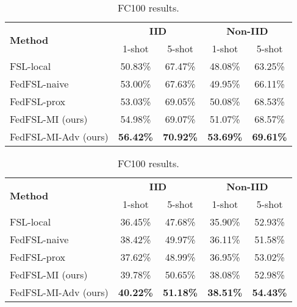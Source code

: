 \begin{table}[htb]
\caption{Results on benchmark datasets.}
\small
\begin{subtable}{\linewidth}
{
\begin{center}
\begin{tabular}{lcccc} \toprule  
\multirow{2}{*}{\textbf{Method}} & \multicolumn{2}{c}{\textbf{IID}} & \multicolumn{2}{c}{\textbf{Non-IID}} \\ 
\cmidrule{2-3} \cmidrule{4-5}    & 1-shot   & 5-shot  & 1-shot   & 5-shot \\ \toprule
FSL-local  & 50.83\%	&  67.47\% & 48.08\% & 63.25\%	 \\
FedFSL-naive~\cite{chen2018fedmeta} & 53.00\%	 &  67.63\%	& 49.95\% & 66.11\% \\
FedFSL-prox~\cite{li2018federated} &  53.03\%	 &  69.05\%	& 50.08\% & 68.53\% \\ \midrule
FedFSL-MI (ours)  & 54.98\% & 69.07\% & 51.07\% & 68.57\% \\
FedFSL-MI-Adv (ours)  & \textbf{56.42\%}	&	\textbf{70.92\%}  & \textbf{53.69\%}& \textbf{69.61\%}    \\  \midrule \bottomrule
\end{tabular}
\end{center}
}
\vspace{-2pt}
\caption{MiniImageNet results.}
\end{subtable}

\begin{subtable}{\linewidth}
{\begin{center}
\begin{tabular}{lcccc} \toprule  
\multirow{2}{*}{\textbf{Method}} & \multicolumn{2}{c}{\textbf{IID}} & \multicolumn{2}{c}{\textbf{Non-IID}} \\ 
\cmidrule{2-3} \cmidrule{4-5}    & 1-shot   & 5-shot  & 1-shot   & 5-shot   \\ \toprule
FSL-local &  36.45\% 	&  47.68\% & 35.90\% & 52.93\%	   \\
FedFSL-naive~\cite{chen2018fedmeta} & 38.42\%	 & 49.97\%	 & 36.11\% & 51.58\%	\\
FedFSL-prox~\cite{li2018federated} & 37.62\% & 48.99\%	& 36.95\% & 53.02\% \\ \midrule
FedFSL-MI (ours)  & 39.78\%	& 50.65\% & 38.08\% & 52.98\% \\
FedFSL-MI-Adv (ours)  & \textbf{40.22\%}	& \textbf{51.18\%}	 & \textbf{38.51\%} & \textbf{54.43\%}       \\ \midrule\bottomrule
\end{tabular}
\end{center}}
\vspace{-2pt}
\caption{FC100 results.}
\vspace{-10pt}
\end{subtable}

\label{tab:res_iid}
\end{table}


